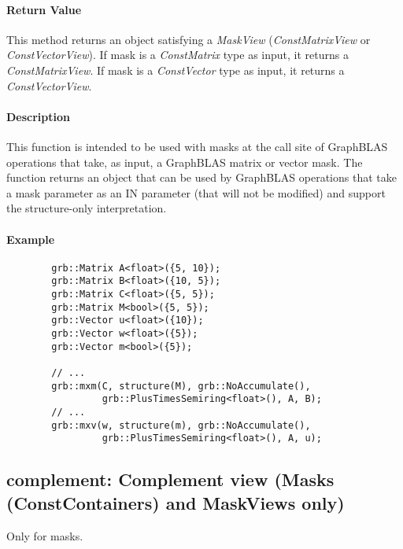 \paragraph{Return Value}

This method returns an object satisfying a \emph{MaskView} (\emph{ConstMatrixView} or 
\emph{ConstVectorView}). If {\sf mask} is a \emph{ConstMatrix} type as input, 
it returns a \emph{ConstMatrixView}.  If {\sf mask} is a \emph{ConstVector} 
type as input, it returns a \emph{ConstVectorView}.  

\paragraph{Description}

This function is intended to be used with masks at the call site of GraphBLAS 
operations that take, as input, a GraphBLAS matrix or vector mask.  The function 
returns an object that can be used by GraphBLAS operations that take a mask 
parameter as an {\sf IN} parameter (that will not be modified) and support the 
structure-only interpretation.

\paragraph{Example}

\begin{verbatim}
        grb::Matrix A<float>({5, 10});
        grb::Matrix B<float>({10, 5});
        grb::Matrix C<float>({5, 5});
        grb::Matrix M<bool>({5, 5});
        grb::Vector u<float>({10});
        grb::Vector w<float>({5});
        grb::Vector m<bool>({5});
        
        // ...
        grb::mxm(C, structure(M), grb::NoAccumulate(), 
                 grb::PlusTimesSemiring<float>(), A, B);
        // ...
        grb::mxv(w, structure(m), grb::NoAccumulate(), 
                 grb::PlusTimesSemiring<float>(), A, u);
\end{verbatim}


\subsection{{\sf complement}: Complement view (Masks (ConstContainers) and MaskViews only)}

Only for masks.  

